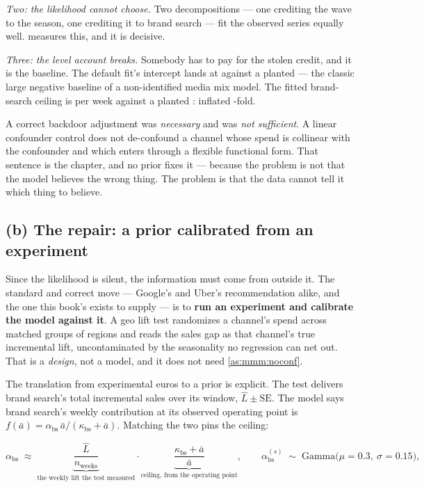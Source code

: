 \emph{Two: the likelihood cannot choose.} Two decompositions --- one crediting the wave to the
season, one crediting it to brand search --- fit the observed series equally well.
 measures this, and it is decisive.

\emph{Three: the level account breaks.} Somebody has to pay for the stolen credit, and it is the
baseline. The default fit's intercept lands at \eur{\nbSixDefBaseline} against a planted
\eur{\nbSixTrueBaseline} --- the classic large negative baseline of a non-identified media mix
model. The fitted brand-search ceiling is \eur{\nbSixDefCeilingBs} per week against a planted
\eur{\nbSixTrueCeilingBs}: inflated \nbSixDefCeilingBsOverTrue-fold.

A correct backdoor adjustment was \emph{necessary} and was \emph{not sufficient}. A linear
confounder control does not de-confound a channel whose spend is collinear with the confounder and
which enters through a flexible functional form. That sentence is the chapter, and no prior fixes
it --- because the problem is not that the model believes the wrong thing. The problem is that the
data cannot tell it which thing to believe.

\subsection*{(b) The repair: a prior calibrated from an experiment}

Since the likelihood is silent, the information must come from outside it. The standard and correct
move --- Google's \citep{chan2017} and Uber's \citep{ng2021} recommendation alike, and the one
this book's  exists to supply --- is to \textbf{run an experiment and calibrate the model
against it}. A geo lift test randomizes a channel's spend across matched groups of regions and
reads the sales gap as that channel's true incremental lift, uncontaminated by the seasonality no
regression can net out. That is a \emph{design}, not a model, and it does not need
\cref{as:mmm:noconf}.

The translation from experimental euros to a prior is explicit. The test delivers brand search's
total incremental sales over its window, $\hat L \pm \text{SE}$. The model says brand search's
weekly contribution at its observed operating point is
$f(\bar a) = \alpha_{\text{bs}}\, \bar a / (\kappa_{\text{bs}} + \bar a)$. Matching the two pins
the ceiling:

\begin{equation}
  \alpha_{\text{bs}}
    \;\approx\; \underbrace{\frac{\hat L}{n_{\text{weeks}}}}_{\text{the weekly lift the test measured}}
    \cdot \underbrace{\frac{\kappa_{\text{bs}} + \bar a}{\bar a}}_{\text{ceiling, from the operating point}},
  \qquad
  \alpha^{(s)}_{\text{bs}} \;\sim\; \text{Gamma}\big(\mu = 0.3,\ \sigma = 0.15\big),
  \label{eq:mmm:calib}
\end{equation}

